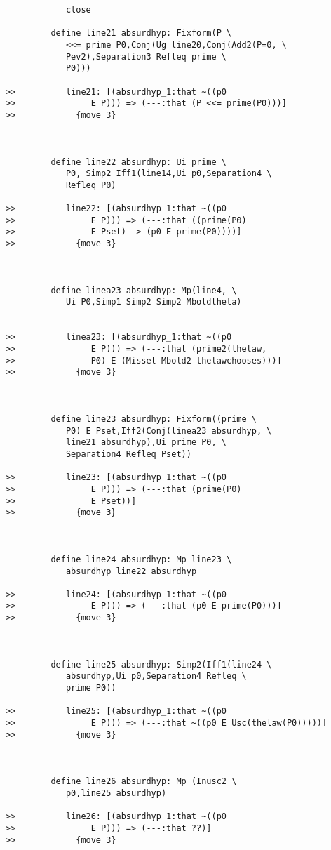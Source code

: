 \documentclass[12pt]{article}
\begin{document}
\begin{verbatim}
            close

         define line21 absurdhyp: Fixform(P \
            <<= prime P0,Conj(Ug line20,Conj(Add2(P=0, \
            Pev2),Separation3 Refleq prime \
            P0)))

>>          line21: [(absurdhyp_1:that ~((p0
>>               E P))) => (---:that (P <<= prime(P0)))]
>>            {move 3}



         define line22 absurdhyp: Ui prime \
            P0, Simp2 Iff1(line14,Ui p0,Separation4 \
            Refleq P0)

>>          line22: [(absurdhyp_1:that ~((p0
>>               E P))) => (---:that ((prime(P0)
>>               E Pset) -> (p0 E prime(P0))))]
>>            {move 3}



         define linea23 absurdhyp: Mp(line4, \
            Ui P0,Simp1 Simp2 Simp2 Mboldtheta)


>>          linea23: [(absurdhyp_1:that ~((p0
>>               E P))) => (---:that (prime2(thelaw,
>>               P0) E (Misset Mbold2 thelawchooses)))]
>>            {move 3}



         define line23 absurdhyp: Fixform((prime \
            P0) E Pset,Iff2(Conj(linea23 absurdhyp, \
            line21 absurdhyp),Ui prime P0, \
            Separation4 Refleq Pset))

>>          line23: [(absurdhyp_1:that ~((p0
>>               E P))) => (---:that (prime(P0)
>>               E Pset))]
>>            {move 3}



         define line24 absurdhyp: Mp line23 \
            absurdhyp line22 absurdhyp

>>          line24: [(absurdhyp_1:that ~((p0
>>               E P))) => (---:that (p0 E prime(P0)))]
>>            {move 3}



         define line25 absurdhyp: Simp2(Iff1(line24 \
            absurdhyp,Ui p0,Separation4 Refleq \
            prime P0))

>>          line25: [(absurdhyp_1:that ~((p0
>>               E P))) => (---:that ~((p0 E Usc(thelaw(P0)))))]
>>            {move 3}



         define line26 absurdhyp: Mp (Inusc2 \
            p0,line25 absurdhyp)

>>          line26: [(absurdhyp_1:that ~((p0
>>               E P))) => (---:that ??)]
>>            {move 3}




\end{verbatim}
\end{document}
